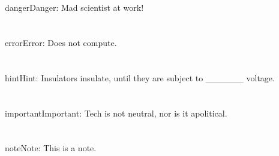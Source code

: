 \documentclass[a4paper,10pt,english]{sphinxmanual}
\begin{document}
\section{}
\label{\detokenize{test:danger}}
\begin{sphinxadmonition}{danger}{Danger:}
\sphinxAtStartPar
Mad scientist at work!
\end{sphinxadmonition}


\section{}
\label{\detokenize{test:error}}
\begin{sphinxadmonition}{error}{Error:}
\sphinxAtStartPar
Does not compute.
\end{sphinxadmonition}


\section{}
\label{\detokenize{test:hint}}
\begin{sphinxadmonition}{hint}{Hint:}
\sphinxAtStartPar
Insulators insulate, until they are subject to \_\_\_\_\_\_ voltage.
\end{sphinxadmonition}


\section{}
\label{\detokenize{test:important}}
\begin{sphinxadmonition}{important}{Important:}
\sphinxAtStartPar
Tech is not neutral, nor is it apolitical.
\end{sphinxadmonition}


\section{}
\label{\detokenize{test:note}}
\begin{sphinxadmonition}{note}{Note:}
\sphinxAtStartPar
This is a note.
\end{sphinxadmonition}


\section{}
\label{\detokenize{test:seealso}}
\end{document}
